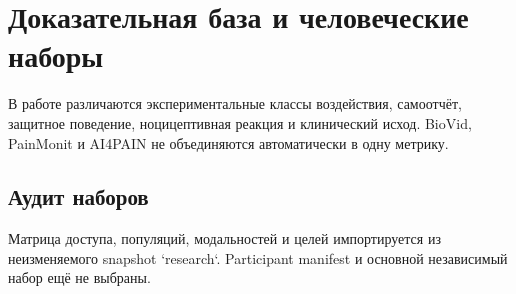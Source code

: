 \chapter{Доказательная база и человеческие наборы}

В работе различаются экспериментальные классы воздействия, самоотчёт, защитное
поведение, ноцицептивная реакция и клинический исход. BioVid, PainMonit и AI4PAIN
не объединяются автоматически в одну метрику.

\section{Аудит наборов}
Матрица доступа, популяций, модальностей и целей импортируется из неизменяемого snapshot
`research`. Participant manifest и основной независимый набор ещё не выбраны.

